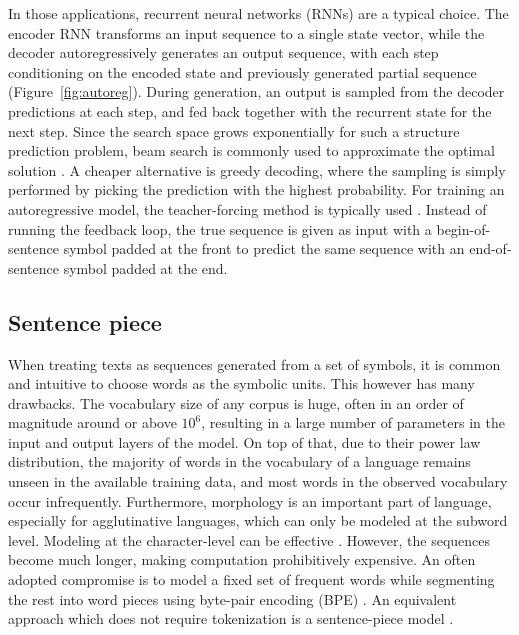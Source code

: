 \documentclass[11pt]{article}
\begin{document}
In those applications, recurrent neural networks (RNNs) are a typical choice.
The encoder RNN transforms an input sequence to a single state vector,
while the decoder autoregressively generates an output sequence,
with each step conditioning on the encoded state and previously generated partial sequence (Figure~\ref{fig:autoreg}).
During generation, an output is sampled from the decoder predictions at each step,
and fed back together with the recurrent state for the next step.
Since the search space grows exponentially for such a structure prediction problem,
beam search is commonly used to approximate the optimal solution \parencite{freitag2017beam}.
A cheaper alternative is greedy decoding,
where the sampling is simply performed by picking the prediction with the highest probability.
For training an autoregressive model,
the teacher-forcing method is typically used \parencite{williams1989learning}.
Instead of running the feedback loop,
the true sequence is given as input with a begin-of-sentence symbol padded at the front
to predict the same sequence with an end-of-sentence symbol padded at the end.

\subsection{Sentence piece}\label{sec:sentence-piece}

When treating texts as sequences generated from a set of symbols,
it is common and intuitive to choose words as the symbolic units.
This however has many drawbacks.
The vocabulary size of any corpus is huge, often in an order of magnitude around or above \(10^{6}\),
resulting in a large number of parameters in the input and output layers of the model.
On top of that, due to their power law distribution,
the majority of words in the vocabulary of a language remains unseen in the available training data,
and most words in the observed vocabulary occur infrequently.
Furthermore, morphology is an important part of language,
especially for agglutinative languages,
which can only be modeled at the subword level.
Modeling at the character-level can be effective \parencite{kalchbrenner2016neural}.
However, the sequences become much longer,
making computation prohibitively expensive.
An often adopted compromise is to model a fixed set of frequent words
while segmenting the rest into word pieces using byte-pair encoding (BPE) \parencite{sennrich2015neural}.
An equivalent approach which does not require tokenization is a sentence-piece model \parencite{kudo2018subword}.
\end{document}
